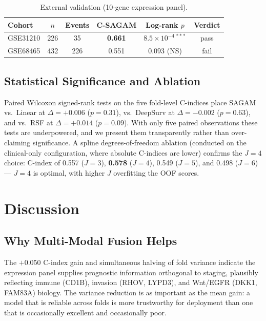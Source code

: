 \documentclass[journal]{IEEEtran}
\begin{document}
\begin{table}[!t]
\centering
\caption{External validation (10-gene expression panel).}
\label{tab:external}
\begin{tabular}{lccccc}
\toprule
\textbf{Cohort} & \textbf{$n$} & \textbf{Events} & \textbf{C-SAGAM} & \textbf{Log-rank $p$} & \textbf{Verdict}\\
\midrule
GSE31210 & 226 & 35  & \textbf{0.661} & $8.5{\times}10^{-4\,***}$ & pass \\
GSE68465 & 432 & 226 & 0.551 & $0.093$ (NS) & fail \\
\bottomrule
\end{tabular}
\end{table}

\subsection{Statistical Significance and Ablation}
Paired Wilcoxon signed-rank tests on the five fold-level C-indices place
SAGAM vs.\ Linear at $\Delta{=}{+}0.006$ ($p{=}0.31$), vs.\ DeepSurv at
$\Delta{=}{-}0.002$ ($p{=}0.63$), and vs.\ RSF at $\Delta{=}{+}0.014$
($p{=}0.09$). With only five paired observations these tests are
underpowered, and we present them transparently rather than over-claiming
significance. A spline degrees-of-freedom ablation (conducted on the
clinical-only configuration, where absolute C-indices are lower) confirms the
$J{=}4$ choice: C-index of 0.557 ($J{=}3$), \textbf{0.578} ($J{=}4$), 0.549
($J{=}5$), and 0.498 ($J{=}6$) --- $J{=}4$ is optimal, with higher $J$
overfitting the OOF scores.

\section{Discussion}
\label{sec:discussion}

\subsection{Why Multi-Modal Fusion Helps}
The $+0.050$ C-index gain and simultaneous halving of fold variance indicate
the expression panel supplies prognostic information orthogonal to staging,
plausibly reflecting immune (CD1B), invasion (RHOV, LYPD3), and Wnt/EGFR
(DKK1, FAM83A) biology. The variance reduction is as important as the mean
gain: a model that is reliable across folds is more trustworthy for deployment
than one that is occasionally excellent and occasionally poor.
\end{document}
